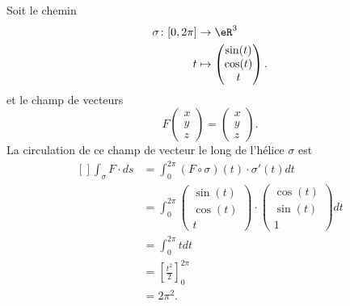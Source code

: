 \begin{example}
	Soit le chemin
	\begin{equation}
		\begin{aligned}
			\sigma\colon \mathopen[ 0 , 2\pi \mathclose] & \to \eR^3                           \\
			t                                            & \mapsto \begin{pmatrix}
				\sin(t) \\
				\cos(t) \\
				t
			\end{pmatrix}.
		\end{aligned}
	\end{equation}
	et le champ de vecteurs
	\begin{equation}
		F\begin{pmatrix}
			x \\
			y \\
			z
		\end{pmatrix}=\begin{pmatrix}
			x \\
			y \\
			z
		\end{pmatrix}.
	\end{equation}
	La circulation de ce champ de vecteur le long de l'hélice \( \sigma\) est
	\begin{equation}
		\begin{aligned}[]
			\int_{\sigma}F\cdot ds & =\int_0^{2\pi}(F\circ \sigma)(t)\cdot \sigma'(t)dt \\
			                       & =\int_0^{2\pi}\begin{pmatrix}
				\sin(t) \\
				\cos(t) \\
				t
			\end{pmatrix}\cdot
			\begin{pmatrix}
				\cos(t) \\
				\sin(t) \\
				1
			\end{pmatrix}dt                                                \\
			                       & =\int_0^{2\pi}tdt                                  \\
			                       & =\left[ \frac{ t^2 }{2} \right]_0^{2\pi}           \\
			                       & =2\pi^2.
		\end{aligned}
	\end{equation}

\end{example}

